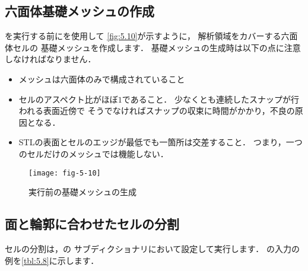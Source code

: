 \subsection{六面体基礎メッシュの作成}
\label{ssec:5.4.2}
を実行する前にを使用して
\autoref{fig:5.10}が示すように，
解析領域をカバーする六面体セルの
%
基礎メッシュを作成します．
基礎メッシュの生成時は以下の点に注意しなければなりません．
\begin{itemize}
 \item メッシュは六面体のみで構成されていること
 \item セルのアスペクト比がほぼ$1$であること．
       少なくとも連続したスナップが行われる表面近傍で
       そうでなければスナップの収束に時間がかかり，不良の原因となる．
 \item STLの表面とセルのエッジが最低でも一箇所は交差すること．
       つまり，一つのセルだけのメッシュでは機能しない．
\end{itemize}


\begin{figure}[ht]
 \texttt{[image: fig-5-10]}
 \caption{実行前の基礎メッシュの生成}
 \label{fig:5.10}
\end{figure}


\subsection{面と輪郭に合わせたセルの分割}
\label{ssec:5.4.3}
%
セルの分割は，の
%
%
サブディクショナリにおいて設定して実行します．
の入力の例を\autoref{tbl:5.8}に示します．


\begin{table}[ht]
 
 \caption{の
%
%
 サブディクショナリのキーワード}
 \label{tbl:5.8}
\end{table}


